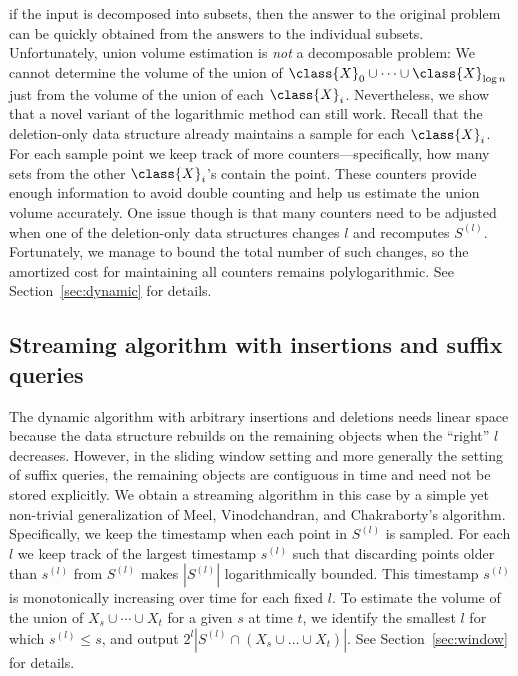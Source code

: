 if the input is decomposed into subsets, then the answer to the original problem can be quickly obtained from the answers to the individual subsets. Unfortunately, union volume estimation is \emph{not} a decomposable problem: We cannot determine the volume of the union of $\class{X}_0\cup \cdots \cup \class{X}_{\log n}$ just from the volume of the union of each $\class{X}_i$.
%
Nevertheless, we show that a novel variant of the logarithmic method can still work. Recall that the deletion-only data structure already maintains a sample for each $\class{X}_i$. For each sample point we keep track of more counters---specifically, how many sets from the other $\class{X}_i$'s contain the point. These counters provide enough information to avoid double counting and help us estimate the union volume accurately.
One issue though is that many counters need to be adjusted when one of the deletion-only data structures changes $l$ and recomputes $S^{(l)}$. Fortunately, we manage to bound the total number of such changes, so the amortized cost for maintaining all counters remains polylogarithmic. See Section~\ref{sec:dynamic} for details.
%
\subsection{Streaming algorithm with insertions and suffix queries}
%
The dynamic algorithm with arbitrary insertions and deletions needs linear space because the data structure rebuilds on the remaining objects when the ``right'' $l$ decreases. However, in the sliding window setting and more generally the setting of suffix queries, the remaining objects are contiguous in time and need not be stored explicitly. We obtain a streaming algorithm in this case by a simple yet non-trivial generalization of Meel, Vinodchandran, and Chakraborty's algorithm. Specifically, we keep the timestamp when each point in $S^{(l)}$ is sampled. For each $l$ we keep track of the largest timestamp $s^{(l)}$ such that discarding points older than $s^{(l)}$ from $S^{(l)}$ makes $|S^{(l)}|$ logarithmically bounded. This timestamp $s^{(l)}$ is monotonically increasing over time for each fixed $l$. To estimate the volume of the union of $X_s \cup \cdots \cup X_t$ for a given $s$ at time $t$, we identify the smallest $l$ for which $s^{(l)} \leq s$, and output $2^l|S^{(l)}\cap (X_s \cup \ldots \cup X_t)|$. See Section~\ref{sec:window} for details.
%
%
